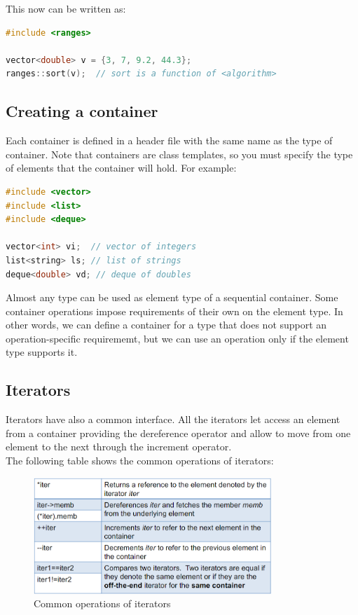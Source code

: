 This now can be written as:\\

\begin{lstlisting}[language=C++]
#include <ranges>

vector<double> v = {3, 7, 9.2, 44.3};
ranges::sort(v);  // sort is a function of <algorithm>
\end{lstlisting}

\subsection{Creating a container}

Each container is defined in a header file with the same name as the type of container.
Note that containers are class templates, so you must specify the type of elements that
the container will hold. For example:\\

\begin{lstlisting}[language=C++]
#include <vector>
#include <list>
#include <deque>

vector<int> vi;  // vector of integers
list<string> ls; // list of strings
deque<double> vd; // deque of doubles
\end{lstlisting}

Almost any type can be used as element type of a sequential container. Some container operations
impose requirements of their own on the element type. In other words, we can define a container
for a type that does not support an operation-specific requirememt, but we can use an operation
only if the element type supports it.

\subsection{Iterators}

Iterators have also a common interface. All the iterators let access an element from a container
providing the dereference operator and allow to move from one element to the next through the
increment operator.\\

The following table shows the common operations of iterators:

\begin{figure}[H]
    \centering
    \includegraphics[width=0.8\textwidth]{figures/it_common_ops.png}
    \caption{Common operations of iterators}
    \label{fig:it_common_ops}
\end{figure}

